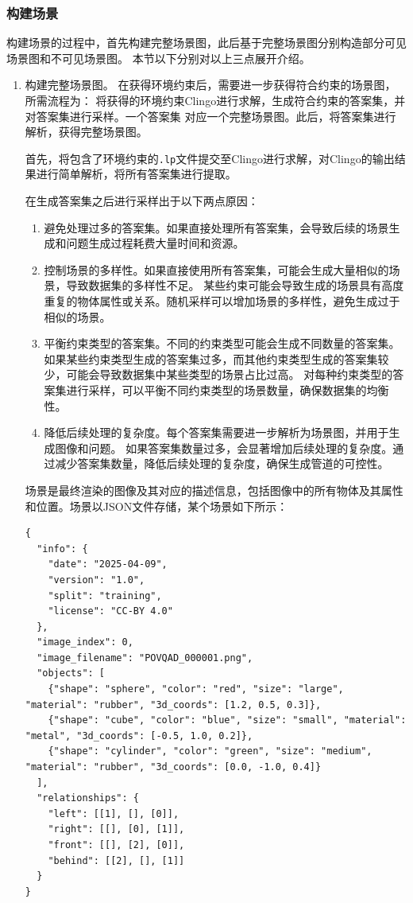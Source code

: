 \subsubsection{构建场景}
构建场景的过程中，首先构建完整场景图，此后基于完整场景图分别构造部分可见场景图和不可见场景图。
本节以下分别对以上三点展开介绍。
\begin{enumerate}[nosep]
\item 构建完整场景图。
在获得环境约束后，需要进一步获得符合约束的场景图，所需流程为：
将获得的环境约束Clingo进行求解，生成符合约束的答案集，并对答案集进行采样。一个答案集
对应一个完整场景图。此后，将答案集进行解析，获得完整场景图。

首先，将包含了环境约束的\texttt{.lp}文件提交至Clingo进行求解，对Clingo的输出结果进行简单解析，将所有答案集进行提取。

在生成答案集之后进行采样出于以下两点原因：
\begin{enumerate}[nosep]
\item 避免处理过多的答案集。如果直接处理所有答案集，会导致后续的场景生成和问题生成过程耗费大量时间和资源。
\item 控制场景的多样性。如果直接使用所有答案集，可能会生成大量相似的场景，导致数据集的多样性不足。
某些约束可能会导致生成的场景具有高度重复的物体属性或关系。随机采样可以增加场景的多样性，避免生成过于相似的场景。
\item 平衡约束类型的答案集。不同的约束类型可能会生成不同数量的答案集。
如果某些约束类型生成的答案集过多，而其他约束类型生成的答案集较少，可能会导致数据集中某些类型的场景占比过高。
对每种约束类型的答案集进行采样，可以平衡不同约束类型的场景数量，确保数据集的均衡性。
\item 降低后续处理的复杂度。每个答案集需要进一步解析为场景图，并用于生成图像和问题。
如果答案集数量过多，会显著增加后续处理的复杂度。通过减少答案集数量，降低后续处理的复杂度，确保生成管道的可控性。
\end{enumerate}

场景是最终渲染的图像及其对应的描述信息，包括图像中的所有物体及其属性和位置。场景以JSON文件存储，某个场景如下所示：
\begin{lstlisting}
{
  "info": {
    "date": "2025-04-09",
    "version": "1.0",
    "split": "training",
    "license": "CC-BY 4.0"
  },
  "image_index": 0,
  "image_filename": "POVQAD_000001.png",
  "objects": [
    {"shape": "sphere", "color": "red", "size": "large", "material": "rubber", "3d_coords": [1.2, 0.5, 0.3]},
    {"shape": "cube", "color": "blue", "size": "small", "material": "metal", "3d_coords": [-0.5, 1.0, 0.2]},
    {"shape": "cylinder", "color": "green", "size": "medium", "material": "rubber", "3d_coords": [0.0, -1.0, 0.4]}
  ],
  "relationships": {
    "left": [[1], [], [0]],
    "right": [[], [0], [1]],
    "front": [[], [2], [0]],
    "behind": [[2], [], [1]]
  }
}
\end{lstlisting}


\end{enumerate}
